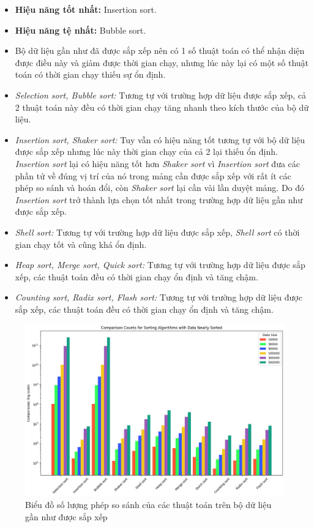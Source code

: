 \begin{itemize}
    \item \textbf{Hiệu năng tốt nhất:} Insertion sort.
    \item \textbf{Hiệu năng tệ nhất:} Bubble sort.
    \item Bộ dữ liệu gần như đã được sắp xếp nên có 1 số thuật toán có thể nhận diện được điều này và giảm được thời gian chạy, nhưng lúc này lại có một số thuật toán có thời gian chạy thiếu sự ổn định.
    \item \textit{Selection sort, Bubble sort:} Tương tự với trường hợp dữ liệu được sắp xếp, cả 2 thuật toán này đều có thời gian chạy tăng nhanh theo kích thước của bộ dữ liệu.
    \item \textit{Insertion sort, Shaker sort:} Tuy vẫn có hiệu năng tốt tương tự với bộ dữ liệu được sắp xếp nhưng lúc này thời gian chạy của cả 2 lại thiếu ổn định. \textit{Insertion sort} lại có hiệu năng tốt hơn \textit{Shaker sort} vì \textit{Insertion sort} đưa các phần tử về đúng vị trí của nó trong mảng cần được sắp xếp với rất ít các phép so sánh và hoán đổi, còn \textit{Shaker sort} lại cần vài lần duyệt mảng. Do đó \textit{Insertion sort} trở thành lựa chọn tốt nhất trong trường hợp dữ liệu gần như được sắp xếp.
    \item \textit{Shell sort:} Tương tự với trường hợp dữ liệu được sắp xếp, \textit{Shell sort} có thời gian chạy tốt và cũng khá ổn định.
    \item \textit{Heap sort, Merge sort, Quick sort:} Tương tự với trường hợp dữ liệu được sắp xếp, các thuật toán đều có thời gian chạy ổn định và tăng chậm.
    \item \textit{Counting sort, Radix sort, Flash sort:} Tương tự với trường hợp dữ liệu được sắp xếp, các thuật toán đều có thời gian chạy ổn định và tăng chậm.
\end{itemize}

\newpage
\begin{figure}[H]
    \centering    
    \includegraphics[width = 1\linewidth]{img/experiment/comparison/COMPARISON_NEARLY.jpg}
    \caption{Biểu đồ số lượng phép so sánh của các thuật toán trên bộ dữ liệu gần như được sắp xếp}
\end{figure}
